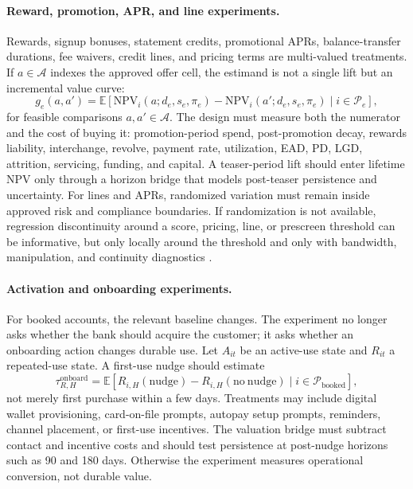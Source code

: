 \documentclass[11pt]{article}
\newcommand{\E}{\mathbb{E}}
\newcommand{\NPV}{\mathrm{NPV}}
\newcommand{\1}{\mathbf{1}}
\begin{document}
\paragraph{Reward, promotion, APR, and line experiments.}
Rewards, signup bonuses, statement credits, promotional APRs, balance-transfer
durations, fee waivers, credit lines, and pricing terms are multi-valued
treatments. If $a\in\mathcal{A}$ indexes the approved offer cell, the estimand
is not a single lift but an incremental value curve:
\begin{equation}
  g_e(a,a')
  =
  \E[\NPV_i(a;d_e,s_e,\pi_e)-\NPV_i(a';d_e,s_e,\pi_e)
  \mid i\in\mathcal{P}_e],
  \label{eq:offer-cell-value-curve}
\end{equation}
for feasible comparisons $a,a'\in\mathcal{A}$. The design must measure both
the numerator and the cost of buying it: promotion-period spend, post-promotion
decay, rewards liability, interchange, revolve, payment rate, utilization,
EAD, PD, LGD, attrition, servicing, funding, and capital. A teaser-period lift
should enter lifetime NPV only through a horizon bridge that models post-teaser
persistence and uncertainty. For lines and APRs, randomized variation must
remain inside approved risk and compliance boundaries. If randomization is not
available, regression discontinuity around a score, pricing, line, or
prescreen threshold can be informative, but only locally around the threshold
and only with bandwidth, manipulation, and continuity diagnostics
\citep{lee2010rd}.

\paragraph{Activation and onboarding experiments.}
For booked accounts, the relevant baseline changes. The experiment no longer
asks whether the bank should acquire the customer; it asks whether an
onboarding action changes durable use. Let $A_{it}$ be an active-use state and
$R_{it}$ a repeated-use state. A first-use nudge should estimate
\begin{equation}
  \tau^{\mathrm{onboard}}_{R,H}
  =
  \E[R_{i,H}(\mathrm{nudge})-R_{i,H}(\mathrm{no\ nudge})
  \mid i\in\mathcal{P}_{\mathrm{booked}}],
  \label{eq:onboarding-repeated-use}
\end{equation}
not merely first purchase within a few days. Treatments may include digital
wallet provisioning, card-on-file prompts, autopay setup prompts, reminders,
channel placement, or first-use incentives. The valuation bridge must subtract
contact and incentive costs and should test persistence at post-nudge horizons
such as 90 and 180 days. Otherwise the experiment measures operational
conversion, not durable value.
\end{document}
